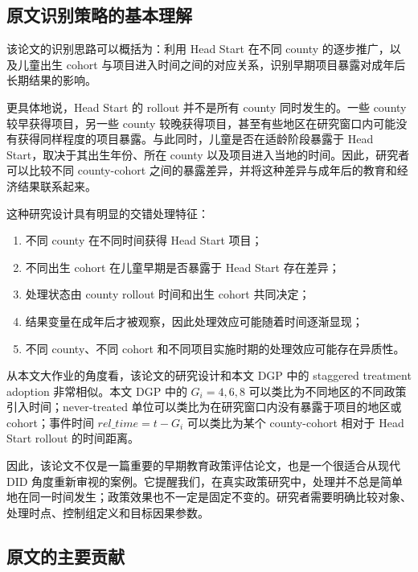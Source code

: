 \documentclass[
  fontset=windows]{ctexart}
\providecommand{\tightlist}{%
  \setlength{\itemsep}{0pt}\setlength{\parskip}{0pt}}
\begin{document}
\subsection{原文识别策略的基本理解}\label{ux539fux6587ux8bc6ux522bux7b56ux7565ux7684ux57faux672cux7406ux89e3}

该论文的识别思路可以概括为：利用 Head Start 在不同 county
的逐步推广，以及儿童出生 cohort
与项目进入时间之间的对应关系，识别早期项目暴露对成年后长期结果的影响。

更具体地说，Head Start 的 rollout 并不是所有 county 同时发生的。一些
county 较早获得项目，另一些 county
较晚获得项目，甚至有些地区在研究窗口内可能没有获得同样程度的项目暴露。与此同时，儿童是否在适龄阶段暴露于
Head Start，取决于其出生年份、所在 county
以及项目进入当地的时间。因此，研究者可以比较不同 county-cohort
之间的暴露差异，并将这种差异与成年后的教育和经济结果联系起来。

这种研究设计具有明显的交错处理特征：

\begin{enumerate}
\def\labelenumi{\arabic{enumi}.}
\tightlist
\item
  不同 county 在不同时间获得 Head Start 项目；
\item
  不同出生 cohort 在儿童早期是否暴露于 Head Start 存在差异；
\item
  处理状态由 county rollout 时间和出生 cohort 共同决定；
\item
  结果变量在成年后才被观察，因此处理效应可能随着时间逐渐显现；
\item
  不同 county、不同 cohort 和不同项目实施时期的处理效应可能存在异质性。
\end{enumerate}

从本文大作业的角度看，该论文的研究设计和本文 DGP 中的 staggered
treatment adoption 非常相似。本文 DGP 中的 \(G_i=4,6,8\)
可以类比为不同地区的不同政策引入时间；never-treated
单位可以类比为在研究窗口内没有暴露于项目的地区或 cohort；事件时间
\(rel\_time=t-G_i\) 可以类比为某个 county-cohort 相对于 Head Start
rollout 的时间距离。

因此，该论文不仅是一篇重要的早期教育政策评估论文，也是一个很适合从现代
DID
角度重新审视的案例。它提醒我们，在真实政策研究中，处理并不总是简单地在同一时间发生；政策效果也不一定是固定不变的。研究者需要明确比较对象、处理时点、控制组定义和目标因果参数。

\subsection{原文的主要贡献}\label{ux539fux6587ux7684ux4e3bux8981ux8d21ux732e}
\end{document}
